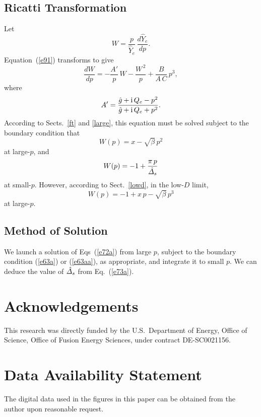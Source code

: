 \documentclass[12pt,prb,aps,notitlepage]{revtex4-1}
\begin{document}
\subsection{Ricatti Transformation}
Let 
\begin{equation}
W= \frac{p}{\hat{Y}_e}\,\frac{d\hat{Y}_e}{dp}.
\end{equation}
Equation~(\ref{e91}) transforms to give
\begin{equation}\label{e72a}
\frac{dW}{dp} =- \frac{A'}{p}\,W -\frac{W^{\,2}}{p} + \frac{B}{A\,C}\,p^3,
\end{equation}
where
\begin{equation}
A' = \frac{\hat{g}+{\rm i}\,Q_e-p^2}{\hat{g}+{\rm i}\,Q_e+p^2}.
\end{equation}
According to Sects.~\ref{ft} and \ref{large}, this equation must be solved subject to the boundary condition that
\begin{equation}\label{e63a}
W(p) = x-\sqrt{\beta}\,p^2
\end{equation}
at large-$p$, and
\begin{equation}\label{e73a}
W (p)=-1+\frac{\pi\,p}{\hat{\mit\Delta}_s}
\end{equation}
at small-$p$. 
However, according to Sect.~\ref{lowd}, in the low-$D$ limit,
\begin{equation}\label{e63aa}
W(p) = -1 +x\,p-\sqrt{\beta}\,p^3
\end{equation}
at large-$p$. 

\subsection{Method of Solution}
We launch a solution of Eqs~(\ref{e72a})  from large $p$, subject to the  boundary condition (\ref{e63a}) or (\ref{e63aa}), as appropriate,  and
integrate it to small $p$. We can deduce the value of $\hat{\mit\Delta}_s$ from Eq.~(\ref{e73a}). 


\section*{Acknowledgements}
This research was directly funded by the U.S.\ Department of Energy,  Office of Science, Office of Fusion Energy Sciences, under  contract DE-SC0021156. 

\section*{Data Availability Statement}
The digital data used in the figures in this paper can be obtained from the author upon reasonable request.
\end{document}
